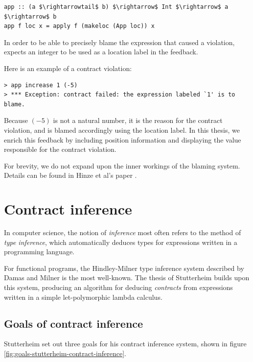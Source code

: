 \documentclass[10pt]{report}
\newcommand{\code}[1]{%
  {%
   \setlength{\fboxsep}{-2\fboxrule}%
   \fcolorbox{black}{light-gray}{\hspace{1.5pt}\strut\texttt{#1}\hspace{1.5pt}}%
  }%
}
\begin{document}
\begin{lstlisting}[mathescape]
app :: (a $\rightarrowtail$ b) $\rightarrow$ Int $\rightarrow$ a $\rightarrow$ b
app f loc x = apply f (makeloc (App loc)) x
\end{lstlisting}

In order to be able to precisely blame the expression that caused a violation, \code{app} expects an integer to be used as a location label in the feedback.

Here is an example of a contract violation:

\begin{lstlisting}[mathescape]
> app increase 1 (-5)
> *** Exception: contract failed: the expression labeled `1' is to blame.
\end{lstlisting}

Because $(-5)$ is not a natural number, it is the reason for the contract violation, and is blamed accordingly using the location label.
In this thesis, we enrich this feedback by including position information and displaying the value responsible for the contract violation.

For brevity, we do not expand upon the inner workings of the blaming system.
Details can be found in Hinze et al's paper \cite{Hinze06typedcontracts}.

\section{Contract inference}
\label{background-inference}

In computer science, the notion of \textit{inference} most often refers to the method of \textit{type inference}, which automatically deduces types for expressions written in a programming language.

For functional programs, the Hindley-Milner type inference system described by Damas and Milner \cite{Damas:1982ve} is the most well-known.
The thesis of Stutterheim \cite{Stutterheim:2013:thesis} builds upon this system, producing an algorithm for deducing \textit{contracts} from expressions written in a simple let-polymorphic lambda calculus.

\subsection{Goals of contract inference}
Stutterheim set out three goals for his contract inference system, shown in figure \ref{fig:goals-stutterheim-contract-inference}.
\end{document}
